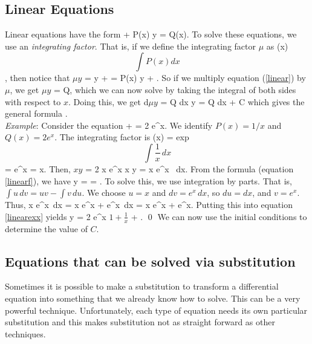 \documentclass[12pt]{article}
\begin{document}
\subsection{Linear Equations}

Linear equations have the form
\be \label{linear}
   + P(x) y = Q(x).
\ee
To solve these equations, we use an \emph{integrating factor}. That is, if
we define the integrating factor $\mu$ as
\be 
  \mu(x) \doteq \exp\[ \int P(x) d x \],
\ee
then notice that
\be
  \(\mu y \) =  y + \mu {} 
  = \mu P(x) y + \mu {}.
\ee
So if we multiply equation (\eqref{linear}) by $\mu$, we get
\be 
  \(\mu y \) = \mu Q,
\ee
which we can now solve by taking the integral of both sides with respect to 
$x$. Doing this, we get
\be
  d\(\mu y\) = \mu Q dx \qquad \implies \qquad
  \mu y = \int \mu Q dx + C
\ee
which gives the general formula
\be
\label{linearf}
.
\ee
\\

\noindent \emph{Example}:
\label{linearsec}
Consider the equation
\be 
   +  = 2 e^x.
\ee
We identify $P(x)=1/x$ and $Q(x)=2e^x$. The integrating factor is
\be 
  \mu(x) = \mbox{exp}\[\int \frac{1}{x} \, dx \] = e^{\ln x} = x.
\ee
Then,
\be \label{linearex}
   \(x y \) = 2 x e^x
  \quad \implies \quad
  x y =  x e^x \, dx. 
\ee
From the formula (equation \eqref{linearf}), we have
\be
\label{linearexx}
y =  = .
\ee
To solve this, we use integration by parts. That is, 
$\int u \, dv = uv - \int v\,  du$. We choose $u=x$ and $dv = e^x \, dx$, so
$du = dx$, and $v=e^x$. Thus,
\be 
  \int x e^x \,dx = x e^x + \int e^x \,dx = x e^x + e^x.
\ee
Putting this into equation \eqref{linearexx} yields
\be 
  y = 2 e^x \(1 + \frac{1}{x}\) + . \qed
\ee
We can now use the initial conditions to determine the value of $C$.





\subsection{Equations that can be solved via substitution}

Sometimes it is possible to make a substitution to transform a differential 
equation into something that we already know how to solve. This can be a very 
powerful technique. Unfortunately, each type of equation needs its own 
particular substitution and this makes substitution not as straight forward as 
other techniques.
\end{document}
